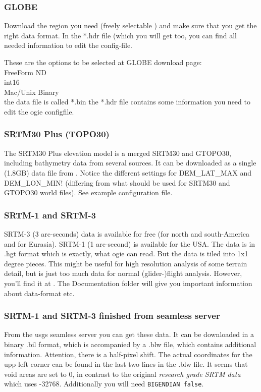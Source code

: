 \subsubsection{GLOBE}
Download the region you need (freely selectable \cite{globe}) and make sure that you
get the right data format. In the *.hdr file (which you will get too,
you can find all needed information to edit the config-file.

These are the options to be selected at GLOBE download page:\\
FreeForm ND\\
int16\\
Mac/Unix Binary\\

the data file is called   *.bin
the *.hdr file contains some information you need to edit the
ogie configfile.


\subsubsection{SRTM30 Plus (TOPO30)}
The SRTM30 Plus \cite{srtm30plus} elevation model is a merged SRTM30 and GTOPO30, including bathymetry data from several sources.
It can be downloaded as a single (1.8GB) data file from \cite{srtm30plus}.
Notice the different settings for DEM\_LAT\_MAX and DEM\_LON\_MIN! (differing from what should be used for SRTM30 and GTOPO30 world files).
See example configuration file.

\subsubsection{SRTM-1 and SRTM-3}
SRTM-3 (3 arc-seconds) data is available for free (for north and south-America and for Eurasia). SRTM-1
(1 arc-second) is available for the USA. The data is in .hgt format which is exactly, what ogie
can read. But the data is tiled into 1x1 degree pieces. This might be useful for high resolution analysis of
some terrain detail, but is just too much data for normal (glider-)flight analysis.
However, you'll find it at \cite{srtmv2}.
The Documentation folder will give you important information about data-format etc.


\subsubsection{SRTM-1 and SRTM-3 finished from seamless server}

From the usgs seamless server \cite{seamless} you can get these data.
It can be downloaded in a binary .bil format, which is accompanied by a .blw file, which contains additional information. Attention, there is a half-pixel shift.
The actual coordinates for the upp-left corner can be found in the last two lines in the .blw file.
It seems that void areas are set to 0, in contrast to the original \emph{research grade SRTM data} which uses -32768.
Additionally you will need \texttt{BIGENDIAN false}.


